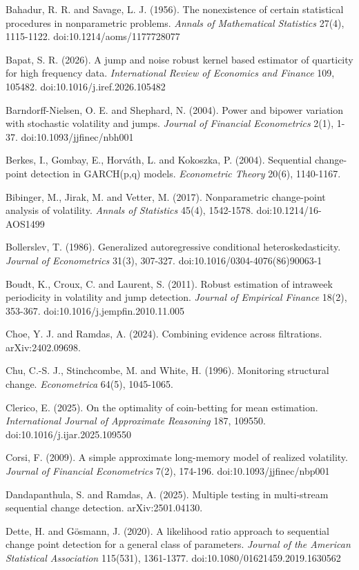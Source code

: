 \documentclass[
]{article}
\begin{document}
Bahadur, R. R. and Savage, L. J. (1956). The nonexistence of certain
statistical procedures in nonparametric problems. \emph{Annals of
Mathematical Statistics} 27(4), 1115-1122. doi:10.1214/aoms/1177728077

Bapat, S. R. (2026). A jump and noise robust kernel based estimator of
quarticity for high frequency data. \emph{International Review of
Economics and Finance} 109, 105482. doi:10.1016/j.iref.2026.105482

Barndorff-Nielsen, O. E. and Shephard, N. (2004). Power and bipower
variation with stochastic volatility and jumps. \emph{Journal of
Financial Econometrics} 2(1), 1-37. doi:10.1093/jjfinec/nbh001

Berkes, I., Gombay, E., Horváth, L. and Kokoszka, P. (2004). Sequential
change-point detection in GARCH(p,q) models. \emph{Econometric Theory}
20(6), 1140-1167.

Bibinger, M., Jirak, M. and Vetter, M. (2017). Nonparametric
change-point analysis of volatility. \emph{Annals of Statistics} 45(4),
1542-1578. doi:10.1214/16-AOS1499

Bollerslev, T. (1986). Generalized autoregressive conditional
heteroskedasticity. \emph{Journal of Econometrics} 31(3), 307-327.
doi:10.1016/0304-4076(86)90063-1

Boudt, K., Croux, C. and Laurent, S. (2011). Robust estimation of
intraweek periodicity in volatility and jump detection. \emph{Journal of
Empirical Finance} 18(2), 353-367. doi:10.1016/j.jempfin.2010.11.005

Choe, Y. J. and Ramdas, A. (2024). Combining evidence across
filtrations. arXiv:2402.09698.

Chu, C.-S. J., Stinchcombe, M. and White, H. (1996). Monitoring
structural change. \emph{Econometrica} 64(5), 1045-1065.

Clerico, E. (2025). On the optimality of coin-betting for mean
estimation. \emph{International Journal of Approximate Reasoning} 187,
109550. doi:10.1016/j.ijar.2025.109550

Corsi, F. (2009). A simple approximate long-memory model of realized
volatility. \emph{Journal of Financial Econometrics} 7(2), 174-196.
doi:10.1093/jjfinec/nbp001

Dandapanthula, S. and Ramdas, A. (2025). Multiple testing in
multi-stream sequential change detection. arXiv:2501.04130.

Dette, H. and Gösmann, J. (2020). A likelihood ratio approach to
sequential change point detection for a general class of parameters.
\emph{Journal of the American Statistical Association} 115(531),
1361-1377. doi:10.1080/01621459.2019.1630562
\end{document}
